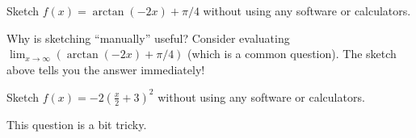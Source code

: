 \documentclass[../main.tex]{subfiles}
\begin{document}

\clearpage
\begin{example}
  Sketch \(f(x) = \arctan(-2x) + \pi/4\) without using any software or calculators.


  


  

\end{example}

Why is sketching ``manually'' useful? Consider evaluating \(\lim_{x \to \infty} \left( \arctan(-2x) + \pi/4 \right)\) (which is a common question). The sketch above tells you the answer immediately!
\clearpage

\begin{example}
  Sketch \(f(x) = -2\left(\frac{x}{2} + 3\right)^{2}\) without using any software or calculators.

  {\scriptsize This question is a bit tricky.}

\end{example}
\end{document}
